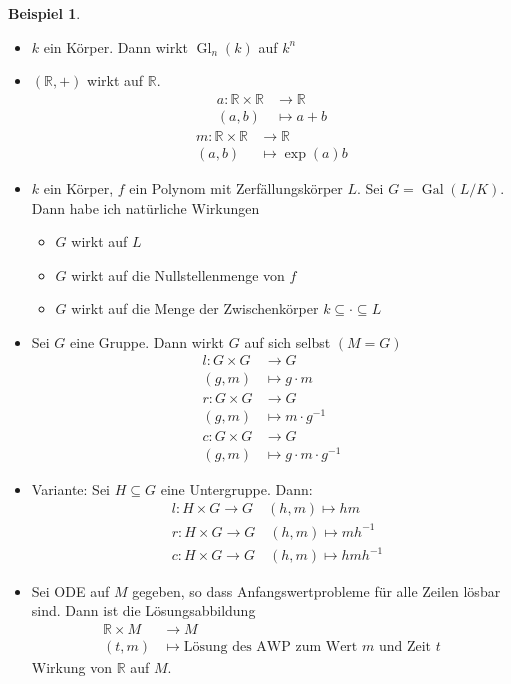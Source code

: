 \documentclass[12pt,parskip=full]{scrartcl}
\newcommand{\setR}{\mathbb{R}}
\DeclareMathOperator{\Gal}{Gal}
\theoremstyle{definition}
\newtheorem{example}[theorem]{Beispiel}
\theoremstyle{remark}
\begin{document}
	\begin{example}
		\begin{itemize}
			\item $k$ ein Körper. Dann wirkt $\operatorname{Gl}_n(k)$ auf $k^n$
			\item $(\setR, +)$ wirkt auf $\setR$.
			\begin{align*}
				a: \setR \times \setR &\longrightarrow \setR \\
				(a,b) &\longmapsto a + b
			\end{align*}
			\begin{align*}
				m: \setR \times \setR &\longrightarrow \setR \\
				(a,b) &\longmapsto \exp(a) b
			\end{align*}
			\item $k$ ein Körper, $f$ ein Polynom mit Zerfällungskörper $L$. Sei $G = \Gal(L/K)$. Dann habe ich natürliche Wirkungen
			\begin{itemize}
				\item $G$ wirkt auf $L$
				\item $G$ wirkt auf die Nullstellenmenge von $f$
				\item $G$ wirkt auf die Menge der Zwischenkörper $k \subseteq \cdot \subseteq L$
			\end{itemize}
			\item Sei $G$ eine Gruppe. Dann wirkt $G$ auf sich selbst $(M = G)$
			\begin{align*}
				l: G \times G &\longrightarrow G \\
				(g,m) &\longmapsto g \cdot m \\
				r: G \times G &\longrightarrow G \\
				(g,m) &\longmapsto m \cdot g^{-1} \\
				c: G \times G &\longrightarrow G \\
				(g,m) &\longmapsto g \cdot m \cdot g^{-1}
			\end{align*}
			\item Variante: Sei $H \subseteq G$ eine Untergruppe. Dann:
			\begin{align*}
				&l: H \times G \to G \quad (h,m) \mapsto h m \\
				&r: H \times G \to G \quad (h,m) \mapsto m h^{-1} \\
				&c: H \times G \to G \quad (h,m) \mapsto h m h^{-1}
			\end{align*}
			\item Sei ODE auf $M$ gegeben, so dass Anfangswertprobleme für alle Zeilen lösbar sind. Dann ist die Lösungsabbildung
			\begin{align*}
				\setR \times M &\longrightarrow M \\
				(t,m) &\longmapsto \text{Lösung des AWP zum Wert $m$ und Zeit $t$}
			\end{align*}
			Wirkung von $\setR$ auf $M$.
		\end{itemize}
	\end{example}
\end{document}
